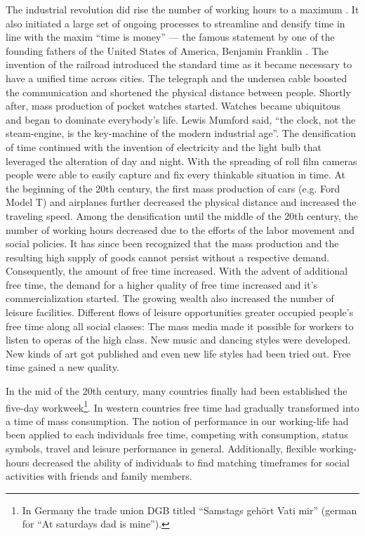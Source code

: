 \documentclass[12pt,numbers=noenddot,parskip,bibliography=totocnumbered,listof=totocnumbered,draft]{scrreprt}
\begin{document}
The industrial revolution did rise the number of working hours to a maximum \citep[p.98]{prahl2002}. It also initiated a large set of ongoing processes to streamline and densify time in line with the maxim ``time is money'' — the famous statement by one of the founding fathers of the United States of America, Benjamin Franklin \citep[p.22]{weber2006}. The invention of the railroad introduced the standard time as it became necessary to have a unified time across cities. The telegraph and the undersea cable boosted the communication and shortened the physical distance between people. Shortly after, mass production of pocket watches started. Watches became ubiquitous and began to dominate everybody's life. Lewis Mumford said, ``the clock, not the steam-engine, is the key-machine of the modern industrial age''. \citep[p.161]{whitrow1989} The densification of time continued with the invention of electricity and the light bulb that leveraged the alteration of day and night. With the spreading of roll film cameras people were able to easily capture and fix every thinkable situation in time. At the beginning of the 20th century, the first mass production of cars (e.g. Ford Model T) and airplanes further decreased the physical distance and increased the traveling speed. \newline
Among the densification until the middle of the 20th century, the number of working hours decreased due to the efforts of the labor movement and social policies. It has since been recognized that the mass production and the resulting high supply of goods cannot persist without a respective demand. Consequently, the amount of free time increased. \cite[p.99-100]{prahl2002} With the advent of additional free time, the demand for a higher quality of free time increased and it's commercialization started. \citep[p.116]{scheuch1972} The growing wealth also increased the number of leisure facilities. Different flows of leisure opportunities greater occupied people's free time along all social classes: The mass media made it possible for workers to listen to operas of the high class. New music and dancing styles were developed. New kinds of art got published and even new life styles had been tried out. Free time gained a new quality. \cite[p.106]{prahl2002}

In the mid of the 20th century, many countries finally had been established the five-day workweek\footnote{In Germany the trade union DGB titled ``Samstags gehört Vati mir'' (german for ``At saturdays dad is mine'').}. In western countries free time had gradually transformed into a time of mass consumption. The notion of performance in our working-life had been applied to each individuals free time, competing with consumption, status symbols, travel and leisure performance in general. \citep[p.112]{prahl2002} Additionally, flexible working-hours decreased the ability of individuals to find matching timeframes for social activities with friends and family members. \citep[p.75]{wajcman2014}
\end{document}
